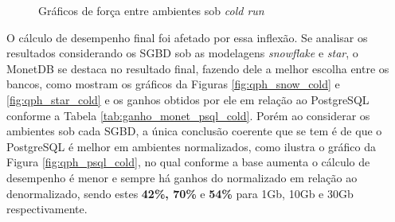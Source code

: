 \begin{figure}[htpb]
        \centering
        \caption{Gráficos de força entre ambientes sob \textit{cold run}}
        \label{fig:power_cold}
\end{figure}

O cálculo de desempenho final foi afetado por essa inflexão. Se analisar os resultados considerando os SGBD sob as modelagens \textit{snowflake} e \textit{star}, o MonetDB se destaca no resultado final, fazendo dele a melhor escolha entre os bancos, como mostram os gráficos da Figuras \ref{fig:qph_snow_cold} e \ref{fig:qph_star_cold} e os ganhos obtidos por ele em relação ao PostgreSQL conforme a Tabela \ref{tab:ganho_monet_psql_cold}. Porém ao considerar os ambientes sob cada SGBD, a única conclusão coerente que se tem é de que o PostgreSQL é melhor em ambientes normalizados, como ilustra o gráfico da Figura \ref{fig:qph_psql_cold}, no qual conforme a base aumenta o cálculo de desempenho é menor e sempre há ganhos do normalizado em relação ao denormalizado, sendo estes \textbf{42\%, 70\%} e \textbf{54\%} para 1Gb, 10Gb e 30Gb respectivamente.

